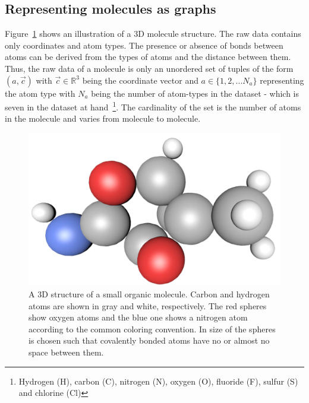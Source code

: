 
\subsection{Representing molecules as graphs}
\label{sec:molecules-as-graphs}

Figure~\ref{fig:molecule-3d} shows an illustration of a 3D molecule structure. The raw data contains only coordinates and atom types. The presence or absence of bonds between atoms can be derived from the types of atoms and the distance between them. Thus, the raw data of a molecule is only an unordered set of tuples of the form $(a, \vec{c})$
with $\vec{c} \in \mathbb{R}^3$ being the coordinate vector
and $a \in \{1, 2, ... N_a\} $ representing the atom type with $N_a$ being the number of atom-types in the dataset - which is seven in the dataset at hand~\footnote{
	Hydrogen (H), carbon (C), nitrogen (N), oxygen (O), fluoride (F), sulfur (S) and chlorine (Cl)
}. The cardinality of the set is the number of atoms in the molecule and varies from molecule to molecule.

\begin{figure}[H]
	\centering
	\includegraphics[width=\linewidth]{figures/molecule-3d-1}
	\caption{A 3D structure of a small organic molecule. Carbon and hydrogen atoms are shown in gray and white, respectively. The red spheres show oxygen atoms and the blue one shows a nitrogen atom according to the common coloring convention. In size of the spheres is chosen such that covalently bonded atoms have no or almost no space between them.
}
	\label{fig:molecule-3d}
\end{figure}

